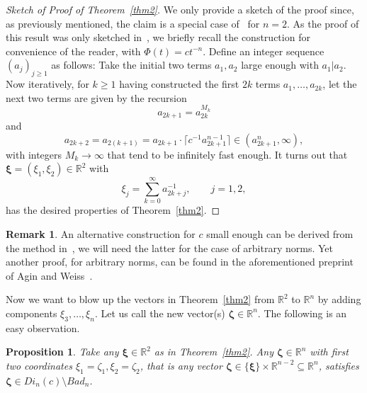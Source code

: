 \documentclass[10pt]{amsart}
\newtheorem{proposition}{Proposition}
\theoremstyle{definition}
\newtheorem{remark}{Remark}
\newcommand{\ux}{\boldsymbol{\xi}}
\newcommand{\uz}{\boldsymbol{\zeta}}
\newcommand{\R}{\mathbb{R}}
\begin{document}
\begin{proof}[Sketch of Proof of Theorem~\ref{thm2}]
We only provide a sketch of the proof since, as previously mentioned, the claim is a special case of~\cite[Theorem~1.1]{j2} for $n=2$. 
As the proof of this result was only sketched in~\cite{j2}, we briefly recall the construction for convenience of the reader, with $\Phi(t)=ct^{-n}$.
Define an integer sequence $(a_j)_{j\ge 1}$ as follows: Take
the initial two terms $a_1, a_2$ large enough with $a_1|a_2$. Now iteratively,
for $k\geq 1$ having constructed the first $2k$ terms $a_1,\ldots,a_{2k}$, let
the next two terms are given by the recursion
\begin{equation*} 
a_{2k+1}= a_{2k}^{M_k}
\end{equation*}
and 
\begin{equation*} 
a_{2k+2}=a_{2(k+1)}= a_{2k+1}\cdot \lceil c^{-1}a_{2k+1}^{n-1}\rceil\in (a_{2k+1}^n,\infty),
\end{equation*}
with integers $M_k\to\infty$ that tend to be infinitely fast enough. It turns 
out that $\ux=(\xi_1,\xi_2)\in \R^{2}$ with 
\[
\xi_j= \sum_{k=0}^{\infty} a_{2k+j}^{-1}, \qquad j=1,2,
\]
has the desired properties of Theorem~\ref{thm2}.
\end{proof}
\begin{remark}
An alternative construction for $c$ small enough can be derived from the method in~\cite{j3}, we will need the latter for the case of arbitrary norms. Yet another proof, for arbitrary norms, can be found in the aforementioned preprint of Agin and Weiss~\cite{AginWeiss2024}.
\end{remark} 


Now we want to blow up the vectors in Theorem~\ref{thm2} from $\R^2$ to $\R^n$ by adding components $\xi_3,\ldots,\xi_n$. Let us call the new vector(s) $\uz\in\R^n$. The following is an easy observation.

\begin{proposition}  \label{pro}
	Take any $\ux\in\R^2$ as in Theorem~\ref{thm2}. 
	Any $\uz\in\R^n$ with first two coordinates $\xi_1=\zeta_1, \xi_2=\zeta_2$,
	that is any vector $\uz\in \{ \ux\}\times \R^{n-2}\subseteq \R^n$, 
	satisfies $\uz\in Di_n(c)\setminus Bad_n$. 
\end{proposition}
\end{document}
